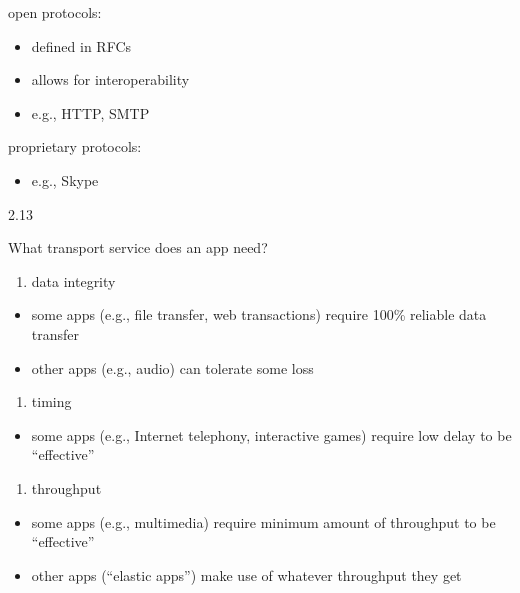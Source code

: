 \documentclass[
]{article}
\begin{document}
open protocols:

\begin{itemize}
\item
  defined in RFCs
\item
  allows for interoperability
\item
  e.g., HTTP, SMTP
\end{itemize}

proprietary protocols:

\begin{itemize}
\item
  e.g., Skype
\end{itemize}

2.13

What transport service does an app need?

\begin{enumerate}
\def\labelenumi{\arabic{enumi}.}
\item
  data integrity
\end{enumerate}

\begin{itemize}
\item
  some apps (e.g., file transfer, web transactions) require 100\%
  reliable data transfer
\item
  other apps (e.g., audio) can tolerate some loss
\end{itemize}

\begin{enumerate}
\def\labelenumi{\arabic{enumi}.}
\item
  timing
\end{enumerate}

\begin{itemize}
\item
  some apps (e.g., Internet telephony, interactive games) require low
  delay to be ``effective''
\end{itemize}

\begin{enumerate}
\def\labelenumi{\arabic{enumi}.}
\item
  throughput
\end{enumerate}

\begin{itemize}
\item
  some apps (e.g., multimedia) require minimum amount of throughput to
  be ``effective''
\item
  other apps (``elastic apps'') make use of whatever throughput they get
\end{itemize}
\end{document}
